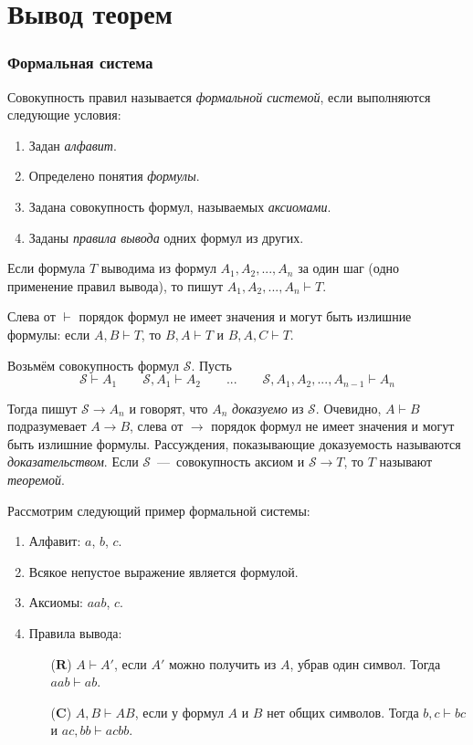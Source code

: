 \part{Вывод теорем}

\section{Формальная система}

Совокупность правил называется {\it формальной системой}, если выполняются следующие
условия:
\begin{enumerate}
	\item{}Задан {\it алфавит}.
	\item{}Определено понятия {\it формулы}.
	\item{}Задана совокупность формул, называемых {\it аксиомами}.
	\item{}Заданы {\it правила вывода} одних формул из других.
\end{enumerate}

Если формула $T$ выводима из формул $A_1,A_2,...,A_{n}$ за один шаг (одно применение
правил вывода), то пишут $A_1,A_2,...,A_{n}\vdash T$.

Слева от $\vdash$ порядок формул не имеет значения и могут быть излишние формулы:
если $A,B\vdash T$, то $B,A\vdash T$ и $B,A,C\vdash T$.

\newcommand\Sx{\mathcal S}
Возьмём совокупность формул $\Sx$. Пусть
\[
	\Sx\vdash A_1\qquad
	\Sx,A_1\vdash A_2\qquad...\qquad
	\Sx,A_1,A_2,...,A_{n-1}\vdash A_{n}
\]

Тогда пишут $\Sx\to A_{n}$ и говорят, что $A_{n}$ {\it доказуемо} из $\Sx$.
Очевидно,	$A\vdash B$ подразумевает $A\to B$, слева от $\to$ порядок формул
не имеет значения и могут быть излишние формулы.
Рассуждения, показывающие доказуемость называются {\it доказательством}.
Если $\Sx$~---~совокупность аксиом и $\Sx\to T$, то $T$ называют
{\it теоремой}.

\newcommand\ruleR{\mathbf{R}}
\newcommand\ruleC{\mathbf{C}}

Рассмотрим следующий пример формальной системы:
\begin{enumerate}
	\item{}Алфавит: $a$, $b$, $c$.
	\item{}Всякое непустое выражение является формулой.
	\item{}Аксиомы: $aab$, $c$.
	\item{}Правила вывода:
	\begin{multicols}{2}
		\begin{enumerate}
			\item[($\ruleR$)]{}$A\vdash A'$, если $A'$ можно получить из $A$,
			убрав один символ. Тогда $aab\vdash ab$.
			\columnbreak
			\item[($\ruleC$)]{}$A,B\vdash AB$, если у формул $A$ и $B$ нет
			общих символов. Тогда $b,c\vdash bc$ и $ac,bb\vdash acbb$.
		\end{enumerate}
	\end{multicols}
\end{enumerate}

